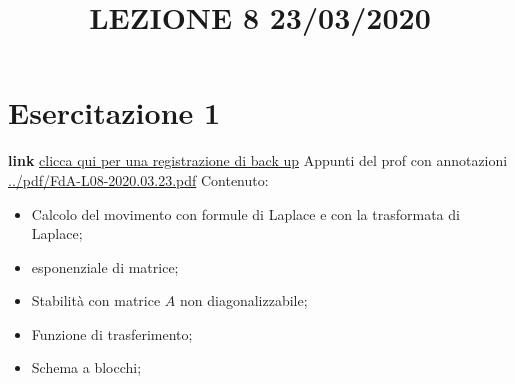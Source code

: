 \section{Esercitazione 1}
\title{LEZIONE 8 23/03/2020}\newline
\textbf{link} \href{https://onedrive.live.com/?authkey=%21AATVJK3srNwxGzs&id=EE092FF4FF7B5B0E%212158&cid=EE092FF4FF7B5B0E}{clicca qui per una registrazione di back up}\newline
\newline
Appunti del prof con annotazioni \url{../pdf/FdA-L08-2020.03.23.pdf}\newline
Contenuto:
\begin{itemize}
    \item Calcolo del movimento con formule di Laplace e con la trasformata di Laplace;
    \item esponenziale di matrice;
    \item Stabilità con matrice $A$ non diagonalizzabile;
    \item Funzione di trasferimento;
    \item Schema a blocchi;
\end{itemize}